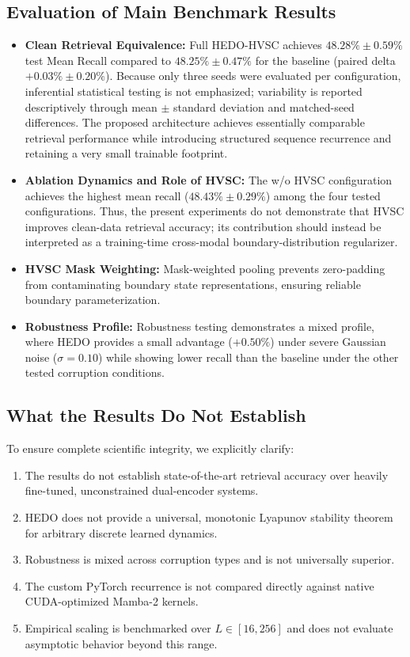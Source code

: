\documentclass[journal]{IEEEtran}
\begin{document}
\subsection{Evaluation of Main Benchmark Results}
\begin{itemize}
    \item \textbf{Clean Retrieval Equivalence:} Full HEDO-HVSC achieves $48.28\% \pm 0.59\%$ test Mean Recall compared to $48.25\% \pm 0.47\%$ for the baseline (paired delta $+0.03\% \pm 0.20\%$). Because only three seeds were evaluated per configuration, inferential statistical testing is not emphasized; variability is reported descriptively through mean $\pm$ standard deviation and matched-seed differences. The proposed architecture achieves essentially comparable retrieval performance while introducing structured sequence recurrence and retaining a very small trainable footprint.
    \item \textbf{Ablation Dynamics and Role of HVSC:} The w/o HVSC configuration achieves the highest mean recall ($48.43\% \pm 0.29\%$) among the four tested configurations. Thus, the present experiments do not demonstrate that HVSC improves clean-data retrieval accuracy; its contribution should instead be interpreted as a training-time cross-modal boundary-distribution regularizer.
    \item \textbf{HVSC Mask Weighting:} Mask-weighted pooling prevents zero-padding from contaminating boundary state representations, ensuring reliable boundary parameterization.
    \item \textbf{Robustness Profile:} Robustness testing demonstrates a mixed profile, where HEDO provides a small advantage ($+0.50\%$) under severe Gaussian noise ($\sigma=0.10$) while showing lower recall than the baseline under the other tested corruption conditions.
\end{itemize}

\subsection{What the Results Do Not Establish}
To ensure complete scientific integrity, we explicitly clarify:
\begin{enumerate}
    \item The results do not establish state-of-the-art retrieval accuracy over heavily fine-tuned, unconstrained dual-encoder systems.
    \item HEDO does not provide a universal, monotonic Lyapunov stability theorem for arbitrary discrete learned dynamics.
    \item Robustness is mixed across corruption types and is not universally superior.
    \item The custom PyTorch recurrence is not compared directly against native CUDA-optimized Mamba-2 kernels.
    \item Empirical scaling is benchmarked over $L \in [16, 256]$ and does not evaluate asymptotic behavior beyond this range.
\end{enumerate}
\end{document}
